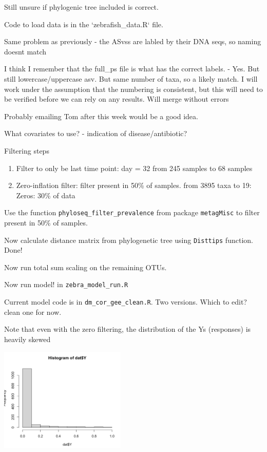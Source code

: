\documentclass[10pt]{article}
\begin{document}
Still unsure if phylogenic tree included is correct.

Code to load data is in the `zebrafish\_data.R` file.

Same problem as previously - the ASvss are labled by their DNA seqs, so naming doesnt match

I think I remember that the full\_ps file is what has the correct labels. - Yes. But still lowercase/uppercase asv. But same number of taxa, so a likely match. I will work under the assumption that the numbering is consistent, but this will need to be verified before we can rely on any results. Will merge without errors

Probably emailing Tom after this week would be a good idea.

What covariates to use? - indication of disease/antibiotic?

Filtering steps
\begin{enumerate}
  \item Filter to only be last time point: day = 32 from 245 samples to 68 samples
  \item Zero-inflation filter: filter present in 50\% of samples.  from 3895 taxa to 19: Zeros: 30\% of data
\end{enumerate}

Use the function \texttt{phyloseq\_filter\_prevalence} from package \texttt{metagMisc} to filter present in 50\% of samples.

Now calculate distance matrix from phylogenetic tree using \texttt{Disttips} function. Done!


Now run total sum scaling on the remaining OTUs.

Now run model! in \texttt{zebra\_model\_run.R}

Current model code is in \texttt{dm\_cor\_gee\_clean.R}. Two versions. Which to edit? clean one for now.

Note that even with the zero filtering, the distribution of the Ys (responses) is heavily skewed

\includegraphics[width=0.45\textwidth]{img/Progress_Report-ce0570ff.png}
\end{document}
